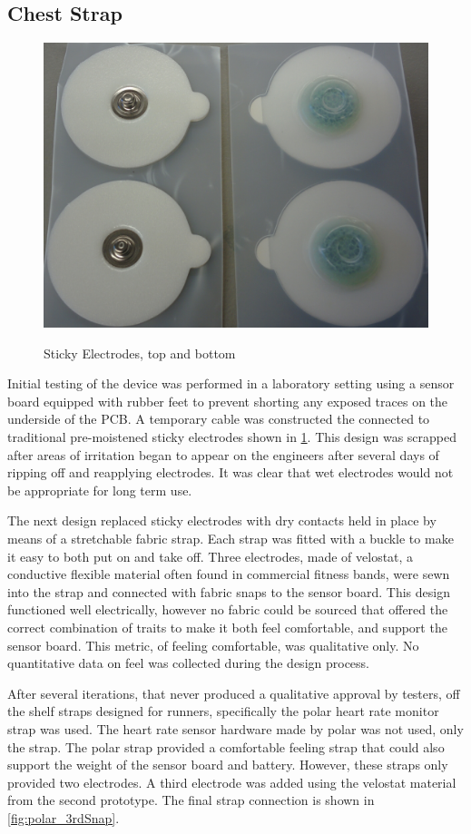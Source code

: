 \subsection {Chest Strap}
\begin{figure}[h]
\begin{center}
	\label{fig:Electrodes}
	\includegraphics[angle=0,scale=1,width=.5\textwidth]{Images/Electrodes.png} 
	\caption{Sticky Electrodes, top and bottom}
\end{center}
\end{figure}
Initial testing of the device was performed in a laboratory setting using a sensor board equipped with rubber feet to prevent shorting any exposed traces on the underside of the PCB. A temporary cable was constructed the connected to traditional pre-moistened sticky electrodes shown in \cref{fig:Electrodes}. This design was scrapped after areas of irritation began to appear on the engineers after several days of ripping off and reapplying electrodes. It was clear that wet electrodes would not be appropriate for long term use.

The next design replaced sticky electrodes with dry contacts held in place by means of a stretchable fabric strap. Each strap was fitted with a buckle to make it easy to both put on and take off. Three electrodes, made of velostat, a conductive flexible material often found in commercial fitness bands, were sewn into the strap and connected with fabric snaps to the sensor board. This design functioned well electrically, however no fabric could be sourced that offered the correct combination of traits to make it both feel comfortable, and support the sensor board. This metric, of feeling comfortable, was qualitative only. No quantitative data on feel was collected during the design process.

After several iterations, that never produced a qualitative approval by testers, off the shelf straps designed for runners, specifically the polar heart rate monitor strap was used. The heart rate sensor hardware made by polar was not used, only the strap. The polar strap provided a comfortable feeling strap that could also support the weight of the sensor board and battery. However, these straps only provided two electrodes. A third electrode was added using the velostat material from the second prototype. The final strap connection is shown in \cref{fig:polar_3rdSnap}.

